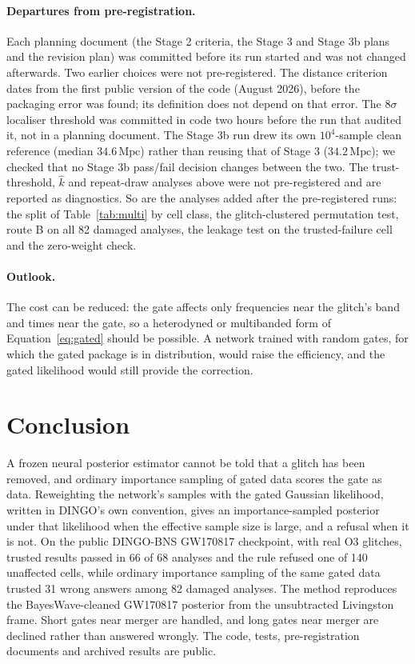 \documentclass{openjournal}
\newcommand{\DINGOBNS}{DINGO-BNS\xspace}
\begin{document}
\paragraph{Departures from pre-registration.}
Each planning document (the Stage 2 criteria, the Stage 3 and Stage 3b plans and the revision plan) was committed before its run started and was not changed afterwards.
Two earlier choices were not pre-registered.
The distance criterion dates from the first public version of the code (August 2026), before the packaging error was found; its definition does not depend on that error.
The $8\sigma$ localiser threshold was committed in code two hours before the run that audited it, not in a planning document.
The Stage 3b run drew its own $10^{4}$-sample clean reference (median $34.6\,\mathrm{Mpc}$) rather than reusing that of Stage 3 ($34.2\,\mathrm{Mpc}$); we checked that no Stage 3b pass/fail decision changes between the two.
The trust-threshold, $\hat k$ and repeat-draw analyses above were not pre-registered and are reported as diagnostics. So are the analyses added after the pre-registered runs: the split of Table~\ref{tab:multi} by cell class, the glitch-clustered permutation test, route B on all 82 damaged analyses, the leakage test on the trusted-failure cell and the zero-weight check.

\paragraph{Outlook.}
The cost can be reduced: the gate affects only frequencies near the glitch's band and times near the gate, so a heterodyned or multibanded form of Equation~\eqref{eq:gated} should be possible.
A network trained with random gates, for which the gated package is in distribution, would raise the efficiency, and the gated likelihood would still provide the correction.

\section{Conclusion}
\label{sec:conclusion}

A frozen neural posterior estimator cannot be told that a glitch has been removed, and ordinary importance sampling of gated data scores the gate as data.
Reweighting the network's samples with the gated Gaussian likelihood, written in DINGO's own convention, gives an importance-sampled posterior under that likelihood when the effective sample size is large, and a refusal when it is not.
On the public \DINGOBNS GW170817 checkpoint, with real O3 glitches, trusted results passed in 66 of 68 analyses and the rule refused one of 140 unaffected cells, while ordinary importance sampling of the same gated data trusted 31 wrong answers among 82 damaged analyses.
The method reproduces the BayesWave-cleaned GW170817 posterior from the unsubtracted Livingston frame.
Short gates near merger are handled, and long gates near merger are declined rather than answered wrongly.
The code, tests, pre-registration documents and archived results are public.
\end{document}
